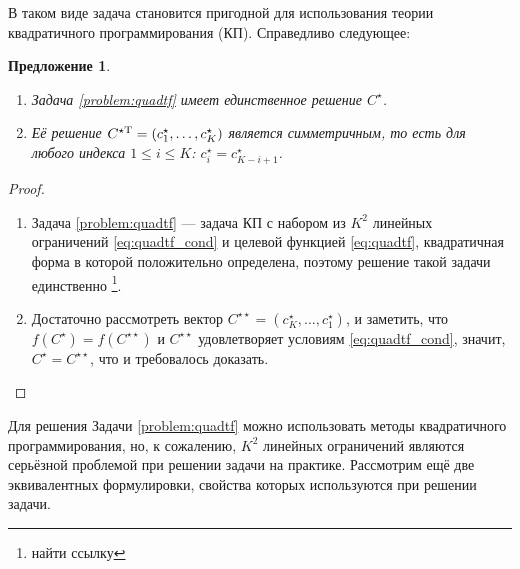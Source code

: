 \documentclass[10pt]{article}
\newtheorem{proposition}{Предложение}
\begin{document}
В таком виде задача становится пригодной для использования теории квадратичного программирования (КП). Справедливо следующее:
\begin{proposition}\label{prop:uniqsymm}
\begin{enumerate}
\item Задача \ref{problem:quadtf} имеет единственное решение $C^\star$.
\item Её решение $C^{\star \mathrm{T}} = (c^\star_1, \ldots, c^\star_K)$ является симметричным, то есть для любого индекса $1 \le i \le K$: $c^\star_i = c^\star_{K - i + 1}$.
\end{enumerate}
\end{proposition}
\begin{proof}
\begin{enumerate}
\item Задача \ref{problem:quadtf} --- задача КП с набором из $K^2$ линейных ограничений \eqref{eq:quadtf_cond} и целевой функцией \eqref{eq:quadtf}, квадратичная форма в которой положительно определена, поэтому решение такой задачи единственно \footnote{найти ссылку}.
\item Достаточно рассмотреть вектор $C^{\star \star} = (c^\star_K, \ldots, c^\star_1)$, и заметить, что $f(C^\star) = f(C^{\star \star})$ и $C^{\star \star}$ удовлетворяет условиям \eqref{eq:quadtf_cond}, значит, $C^\star = C^{\star \star}$, что и требовалось доказать.
\end{enumerate}
\end{proof}
Для решения Задачи \ref{problem:quadtf} можно использовать методы квадратичного программирования, но, к сожалению, $K^2$ линейных ограничений являются серьёзной проблемой при решении задачи на практике. Рассмотрим ещё две эквивалентных формулировки, свойства которых используются при решении задачи.
\end{document}
